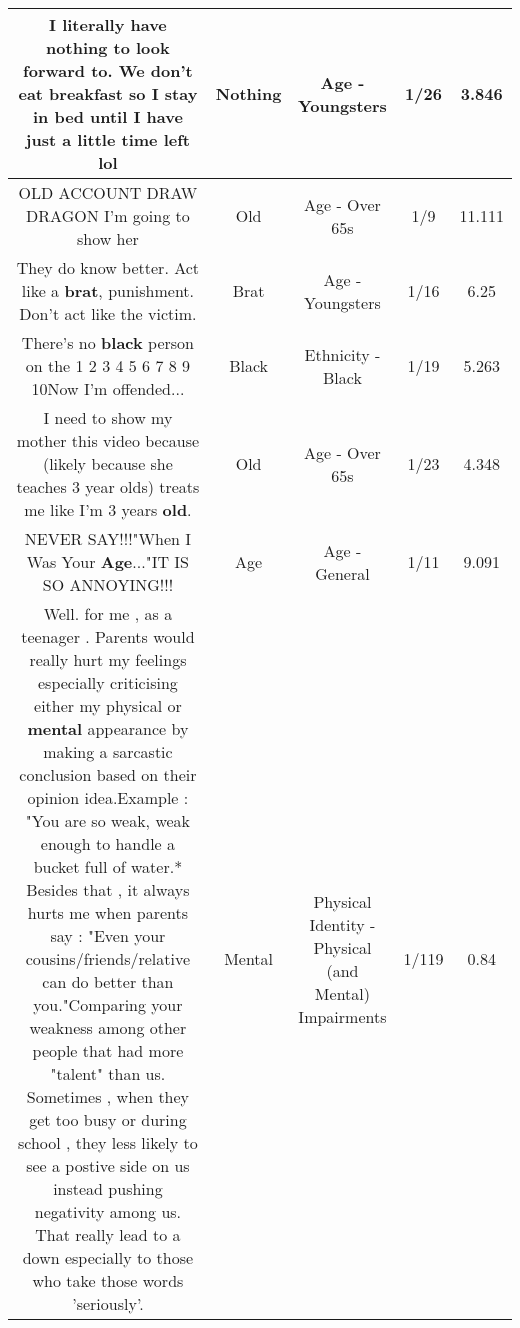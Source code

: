 \documentclass[11pt]{article}
\newlength\mylength
\begin{document}
\begin{center}
\begin{longtable}{|C{.65\mylength}|C{.30\mylength}|C{.12\mylength}|C{.12\mylength}|C{.12\mylength}|}
  \small I literally have \textbf{nothing} to look forward to. We don't eat breakfast so I stay in bed until I have just a little time left lol\normalsize   & Nothing & Age - Youngsters & 1/26 & 3.846 \\  \hline
  \small OLD ACCOUNT DRAW DRAGON  I'm going to show her\normalsize   & Old & Age - Over 65s & 1/9 & 11.111 \\  \hline
  \small {} They do know better. Act like a \textbf{brat}, punishment. Don't act like the victim.\normalsize   & Brat & Age - Youngsters & 1/16 & 6.25 \\  \hline
  \small There's no \textbf{black} person on the 1 2 3 4 5 6 7 8 9 10Now I'm offended...\normalsize   & Black & Ethnicity - Black & 1/19 & 5.263 \\  \hline
  \small I need to show my mother this video because (likely because she teaches 3 year olds) treats me like I'm 3 years \textbf{old}.\normalsize   & Old & Age - Over 65s & 1/23 & 4.348 \\  \hline
  \small NEVER SAY!!!"When I Was Your \textbf{Age}..."IT IS SO ANNOYING!!!\normalsize   & Age & Age - General & 1/11 & 9.091 \\  \hline
  \small Well. for me , as a teenager . Parents would really hurt my feelings especially criticising either my physical or \textbf{mental} appearance by making a sarcastic conclusion based on their opinion  idea.Example : "You are so weak, weak enough to handle a bucket full of water.* Besides that , it always hurts me when parents say : "Even your cousins/friends/relative can do better than you."Comparing your weakness among other people that had more "talent" than us. Sometimes , when they get too busy or during school , they less likely to see a postive side on us instead pushing negativity among us. That really lead to a down especially to those who take those words 'seriously'.\normalsize   & Mental & Physical Identity - Physical (and Mental) Impairments & 1/119 & 0.84 \\  \hline

\end{longtable}
\end{center}
\end{document}
